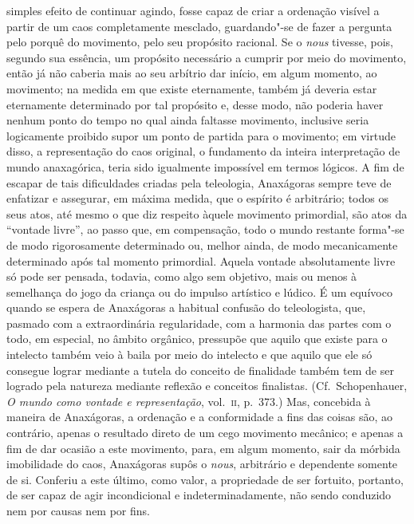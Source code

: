 simples efeito de continuar agindo, fosse capaz de criar a ordenação
visível a partir de um caos completamente mesclado, guardando"-se de
fazer a pergunta pelo porquê do movimento, pelo seu propósito racional.
Se o \textit{nous} tivesse, pois, segundo sua essência, um propósito
necessário a cumprir por meio do movimento, então já não caberia mais
ao seu arbítrio dar início, em algum momento, ao movimento; na medida
em que existe eternamente, também já deveria estar eternamente
determinado por tal propósito e, desse modo, não poderia haver nenhum
ponto do tempo no qual ainda faltasse movimento, inclusive seria
logicamente proibido supor um ponto de partida para o movimento; em
virtude disso, a representação do caos original, o fundamento da
inteira interpretação de mundo anaxagórica, teria sido igualmente
impossível em termos lógicos. A fim de escapar de tais dificuldades
criadas pela teleologia, Anaxágoras sempre teve de enfatizar e
assegurar, em máxima medida, que o espírito é arbitrário; todos os seus
atos, até mesmo o que diz respeito àquele movimento primordial, são
atos da ``vontade livre'', ao passo que, em compensação, todo o mundo
restante forma"-se de modo rigorosamente determinado ou, melhor ainda,
de modo mecanicamente determinado após tal momento primordial. Aquela
vontade absolutamente livre só pode ser pensada, todavia, como algo sem
objetivo, mais ou menos à semelhança do jogo da criança ou do
impulso artístico e lúdico. É um equívoco quando se espera de Anaxágoras a habitual
confusão do teleologista, que, pasmado com a extraordinária
regularidade, com a harmonia das partes com o todo, em especial, no
âmbito orgânico, pressupõe que aquilo que existe para o intelecto
também veio à baila por meio do intelecto e que aquilo que ele só
consegue lograr mediante a tutela do conceito de finalidade também tem
de ser logrado pela natureza mediante reflexão e conceitos finalistas. (Cf.~Schopenhauer, 
\textit{O mundo como vontade e representação}, vol.~\textsc{ii},
p.~373.) Mas, concebida à maneira de Anaxágoras, a ordenação e a
conformidade a fins das coisas são, ao contrário, apenas o resultado
direto de um cego movimento mecânico; e apenas a fim de dar ocasião a
este movimento, para, em algum momento, sair da mórbida imobilidade do
caos, Anaxágoras supôs o \textit{nous}, arbitrário e dependente somente
de si. Conferiu a este último, como valor, a propriedade de ser
fortuito, portanto, de ser capaz de agir incondicional e
indeterminadamente, não sendo conduzido nem por causas nem por fins.


